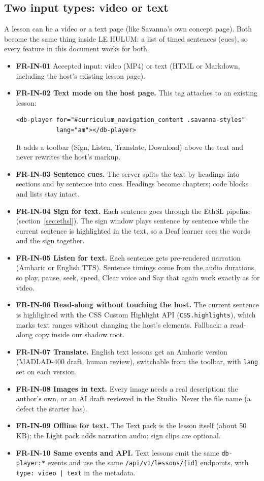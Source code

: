\documentclass[11pt,a4paper]{article}
\newcommand{\code}[1]{\texttt{#1}}
\newcommand{\req}[1]{\textbf{#1}}
\begin{document}
\subsection{Two input types: video or text}
A lesson can be a video or a text page (like Savanna's own concept page). Both become the same thing inside LE HULUM: a list of timed sentences (cues), so every feature in this document works for both.
\begin{itemize}
  \item \req{FR-IN-01} Accepted input: video (MP4) or text (HTML or Markdown, including the host's existing lesson page).
  \item \req{FR-IN-02 Text mode on the host page.} This tag attaches to an existing lesson:
\begin{verbatim}
<db-player for="#curriculum_navigation_content .savanna-styles"
           lang="am"></db-player>
\end{verbatim}
It adds a toolbar (Sign, Listen, Translate, Download) above the text and never rewrites the host's markup.
  \item \req{FR-IN-03 Sentence cues.} The server splits the text by headings into sections and by sentence into cues. Headings become chapters; code blocks and lists stay intact.
  \item \req{FR-IN-04 Sign for text.} Each sentence goes through the EthSL pipeline (section~\ref{sec:ethsl}). The sign window plays sentence by sentence while the current sentence is highlighted in the text, so a Deaf learner sees the words and the sign together.
  \item \req{FR-IN-05 Listen for text.} Each sentence gets pre-rendered narration (Amharic or English TTS). Sentence timings come from the audio durations, so play, pause, seek, speed, Clear voice and Say that again work exactly as for video.
  \item \req{FR-IN-06 Read-along without touching the host.} The current sentence is highlighted with the CSS Custom Highlight API (\code{CSS.highlights}), which marks text ranges without changing the host's elements. Fallback: a read-along copy inside our shadow root.
  \item \req{FR-IN-07 Translate.} English text lessons get an Amharic version (MADLAD-400 draft, human review), switchable from the toolbar, with \code{lang} set on each version.
  \item \req{FR-IN-08 Images in text.} Every image needs a real description: the author's own, or an AI draft reviewed in the Studio. Never the file name (a defect the starter has).
  \item \req{FR-IN-09 Offline for text.} The Text pack is the lesson itself (about 50 KB); the Light pack adds narration audio; sign clips are optional.
  \item \req{FR-IN-10 Same events and API.} Text lessons emit the same \code{db-player:*} events and use the same \code{/api/v1/lessons/\{id\}} endpoints, with \code{type: video | text} in the metadata.
\end{itemize}
\end{document}
